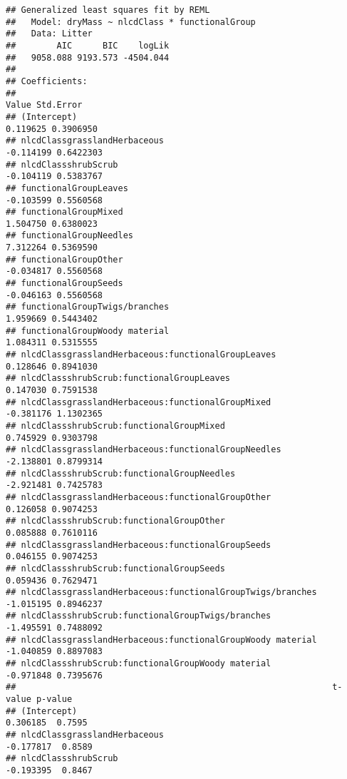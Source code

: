 \documentclass[]{article}
\begin{document}
\begin{verbatim}
## Generalized least squares fit by REML
##   Model: dryMass ~ nlcdClass * functionalGroup 
##   Data: Litter 
##        AIC      BIC    logLik
##   9058.088 9193.573 -4504.044
## 
## Coefficients:
##                                                                Value Std.Error
## (Intercept)                                                 0.119625 0.3906950
## nlcdClassgrasslandHerbaceous                               -0.114199 0.6422303
## nlcdClassshrubScrub                                        -0.104119 0.5383767
## functionalGroupLeaves                                      -0.103599 0.5560568
## functionalGroupMixed                                        1.504750 0.6380023
## functionalGroupNeedles                                      7.312264 0.5369590
## functionalGroupOther                                       -0.034817 0.5560568
## functionalGroupSeeds                                       -0.046163 0.5560568
## functionalGroupTwigs/branches                               1.959669 0.5443402
## functionalGroupWoody material                               1.084311 0.5315555
## nlcdClassgrasslandHerbaceous:functionalGroupLeaves          0.128646 0.8941030
## nlcdClassshrubScrub:functionalGroupLeaves                   0.147030 0.7591538
## nlcdClassgrasslandHerbaceous:functionalGroupMixed          -0.381176 1.1302365
## nlcdClassshrubScrub:functionalGroupMixed                    0.745929 0.9303798
## nlcdClassgrasslandHerbaceous:functionalGroupNeedles        -2.138801 0.8799314
## nlcdClassshrubScrub:functionalGroupNeedles                 -2.921481 0.7425783
## nlcdClassgrasslandHerbaceous:functionalGroupOther           0.126058 0.9074253
## nlcdClassshrubScrub:functionalGroupOther                    0.085888 0.7610116
## nlcdClassgrasslandHerbaceous:functionalGroupSeeds           0.046155 0.9074253
## nlcdClassshrubScrub:functionalGroupSeeds                    0.059436 0.7629471
## nlcdClassgrasslandHerbaceous:functionalGroupTwigs/branches -1.015195 0.8946237
## nlcdClassshrubScrub:functionalGroupTwigs/branches          -1.495591 0.7488092
## nlcdClassgrasslandHerbaceous:functionalGroupWoody material -1.040859 0.8897083
## nlcdClassshrubScrub:functionalGroupWoody material          -0.971848 0.7395676
##                                                              t-value p-value
## (Intercept)                                                 0.306185  0.7595
## nlcdClassgrasslandHerbaceous                               -0.177817  0.8589
## nlcdClassshrubScrub                                        -0.193395  0.8467

\end{verbatim}
\end{document}
